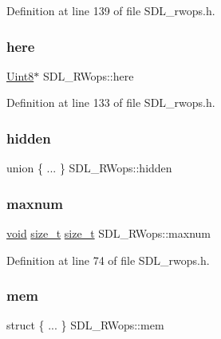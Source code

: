 Definition at line 139 of file S\+D\+L\+\_\+rwops.\+h.

\mbox{\label{struct_s_d_l___r_wops_a6fc84601c17e347c6ef24c63a79deb57}} 
\subsubsection{\texorpdfstring{here}{here}}
{\footnotesize\ttfamily \mbox{\hyperlink{_s_d_l__stdinc_8h_a2944638813a090aa23e62f4da842c3e2}{Uint8}}$\ast$ S\+D\+L\+\_\+\+R\+Wops\+::here}



Definition at line 133 of file S\+D\+L\+\_\+rwops.\+h.

\mbox{\label{struct_s_d_l___r_wops_a2bf0dec0395f771b30c841fc7296164b}} 
\subsubsection{\texorpdfstring{hidden}{hidden}}
{\footnotesize\ttfamily union \{ ... \}   S\+D\+L\+\_\+\+R\+Wops\+::hidden}

\mbox{\label{struct_s_d_l___r_wops_a7786282ec28451085908f70048ee32c8}} 
\subsubsection{\texorpdfstring{maxnum}{maxnum}}
{\footnotesize\ttfamily \mbox{\hyperlink{_s_d_l__opengles2__gl2ext_8h_ae5d8fa23ad07c48bb609509eae494c95}{void}} \mbox{\hyperlink{struct_s_d_l___r_wops_acd9a3c6e840d285c1e30cadaf99097b2}{size\+\_\+t}} \mbox{\hyperlink{struct_s_d_l___r_wops_acd9a3c6e840d285c1e30cadaf99097b2}{size\+\_\+t}} S\+D\+L\+\_\+\+R\+Wops\+::maxnum}



Definition at line 74 of file S\+D\+L\+\_\+rwops.\+h.

\mbox{\label{struct_s_d_l___r_wops_a830ef39b29712325ee60d2c09190fdfe}} 
\subsubsection{\texorpdfstring{mem}{mem}}
{\footnotesize\ttfamily struct \{ ... \}   S\+D\+L\+\_\+\+R\+Wops\+::mem}

